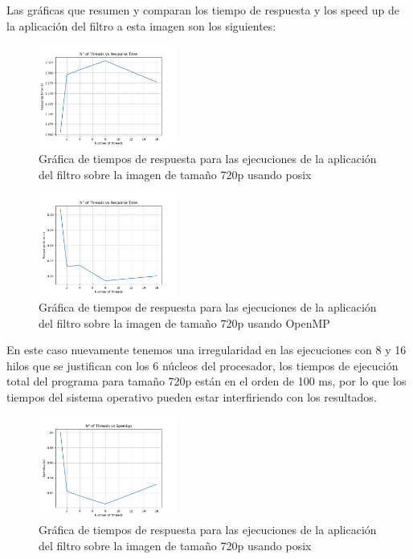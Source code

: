 Las gráficas que resumen y comparan los tiempo de respuesta y los speed up de la aplicación del filtro a esta imagen son los siguientes:

\begin{figure}[H]
    \centering
    \includegraphics[width=0.4\textwidth]{../plots/720p_response_time.png}
    \caption{Gráfica de tiempos de respuesta para las ejecuciones de la aplicación del filtro sobre la imagen de tamaño 720p usando posix}
\end{figure}

\begin{figure}[H]
    \centering
    \includegraphics[width=0.4\textwidth]{../plots/omp_720p_response_time.png}
    \caption{Gráfica de tiempos de respuesta para las ejecuciones de la aplicación del filtro sobre la imagen de tamaño 720p usando OpenMP}
\end{figure}

En este caso nuevamente tenemos una irregularidad en las ejecuciones con 8 y 16 hilos que se justifican con los 6 núcleos del procesador, los tiempos de ejecución total del programa para tamaño 720p están en el orden de 100 ms, por lo que los tiempos del sistema operativo pueden estar interfiriendo con los resultados.

\begin{figure}[H]
    \centering
    \includegraphics[width=0.4\textwidth]{../plots/720p_speedup.png}
    \caption{Gráfica de tiempos de respuesta para las ejecuciones de la aplicación del filtro sobre la imagen de tamaño 720p usando posix}
\end{figure}

